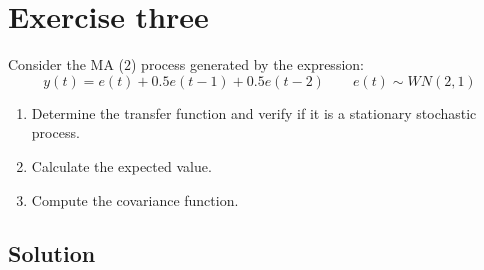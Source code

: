 \section{Exercise three}

Consider the MA ($2$) process generated by the expression:
\[y(t)=e(t)+0.5e(t-1)+0.5e(t-2) \qquad e(t) \sim WN(2,1)\]
\begin{enumerate}
    \item Determine the transfer function and verify if it is a stationary stochastic process.
    \item Calculate the expected value.
    \item Compute the covariance function.
\end{enumerate}

\subsection*{Solution}
